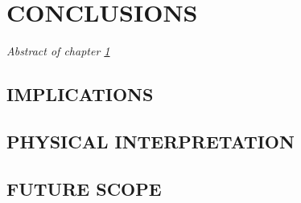 \def\baselinestretch{1}
\chapter{CONCLUSIONS} \label{chap:conclusion}
    \minitoc
    \emph{Abstract of chapter \ref{chap:conclusion}}
    
    \section{IMPLICATIONS}
    
    \section{PHYSICAL INTERPRETATION}
    
    \section{FUTURE SCOPE}